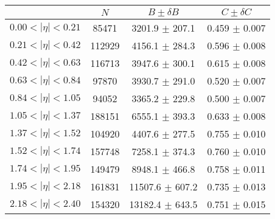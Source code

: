 \begin{tabular}{lccc}
\hline
    &   $N$   & $B \pm \delta B$  &  $C \pm \delta C$ \\
\hline
$0.00 < |\eta| <0.21$          & 85471      & 3201.9     $\pm$ 207.1 & 0.459      $\pm$ 0.007 \\
$0.21 < |\eta| <0.42$          & 112929     & 4156.1     $\pm$ 284.3 & 0.596      $\pm$ 0.008 \\
$0.42 < |\eta| <0.63$          & 116713     & 3947.6     $\pm$ 300.1 & 0.615      $\pm$ 0.008 \\
$0.63 < |\eta| <0.84$          & 97870      & 3930.7     $\pm$ 291.0 & 0.520      $\pm$ 0.007 \\
$0.84 < |\eta| <1.05$          & 94052      & 3365.2     $\pm$ 229.8 & 0.500      $\pm$ 0.007 \\
$1.05 < |\eta| <1.37$          & 188151     & 6555.1     $\pm$ 393.3 & 0.633      $\pm$ 0.008 \\
$1.37 < |\eta| <1.52$          & 104920     & 4407.6     $\pm$ 277.5 & 0.755      $\pm$ 0.010 \\
$1.52 < |\eta| <1.74$          & 157748     & 7258.1     $\pm$ 374.3 & 0.760      $\pm$ 0.010 \\
$1.74 < |\eta| <1.95$          & 149479     & 8948.1     $\pm$ 466.8 & 0.758      $\pm$ 0.011 \\
$1.95 < |\eta| <2.18$          & 161831     & 11507.6    $\pm$ 607.2 & 0.735      $\pm$ 0.013 \\
$2.18 < |\eta| <2.40$          & 154320     & 13182.4    $\pm$ 643.5 & 0.751      $\pm$ 0.015 \\
\hline
\end{tabular}
